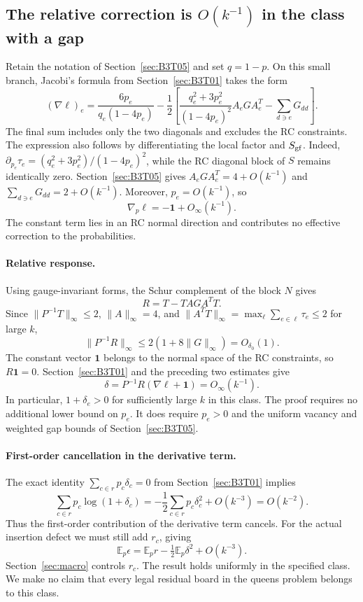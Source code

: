 \subsection{The relative correction is \texorpdfstring{$O(k^{-1})$}{O(1/k)} in the class with a
gap}\label{sec:B3T06}
Retain the notation of Section~\ref{sec:B3T05} and set $q=1-p$.
On this small branch, Jacobi's formula from Section~\ref{sec:B3T01} takes the form
\[
 (\nabla\ell)_e=\frac{6p_e}{q_e(1-4p_e)}
 -\frac12\left[
 \frac{q_e^2+3p_e^2}{(1-4p_e)^2}A_eGA_e^T
 -\sum_{d\ni e}G_{dd}\right].
\]
The final sum includes only the two diagonals and excludes the RC constraints.
The expression also follows by differentiating the local factor and $S_{\rm gf}$. Indeed,
$\partial_{p_e}\tau_e=(q_e^2+3p_e^2)/(1-4p_e)^2$, while the RC diagonal block of $S$ remains identically
zero.
Section~\ref{sec:B3T05} gives $A_eGA_e^T=4+O(k^{-1})$ and $\sum_{d\ni e}G_{dd}=2+O(k^{-1})$.
Moreover, $p_e=O(k^{-1})$, so
\[
 \boxed{\nabla_p\ell=-\mathbf1+O_\infty(k^{-1}).}
\]
The constant term lies in an RC normal direction and contributes no effective correction to the
probabilities.

\paragraph{Relative response.}
Using gauge-invariant forms, the Schur complement of the block $N$ gives
\[
 R=T-TAG A^TT.
\]
Since $\|P^{-1}T\|_\infty\le2$, $\|A\|_\infty=4$, and $\|A^TT\|_\infty=\max_\ell\sum_{e\in\ell}\tau_e\le2$
for large $k$,
\[
 \|P^{-1}R\|_\infty
 \le2(1+8\|G\|_\infty)=O_{\delta_0}(1).
\]
The constant vector $\mathbf1$ belongs to the normal space of the RC constraints, so $R\mathbf1=0$.
Section~\ref{sec:B3T01} and the preceding two estimates give
\[
 \boxed{\delta=P^{-1}R(\nabla\ell+\mathbf1)=O_\infty(k^{-1}).}
\]
In particular, $1+\delta_e>0$ for sufficiently large $k$ in this class. The proof requires no additional
lower bound on $p_e$. It does require $p_e>0$ and the uniform vacancy and weighted gap bounds of
Section~\ref{sec:B3T05}.

\paragraph{First-order cancellation in the derivative term.}
The exact identity $\sum_{c\in r}p_c\delta_c=0$ from Section~\ref{sec:B3T01} implies
\[
 \sum_{c\in r}p_c\log(1+\delta_c)
 =-\frac12\sum_{c\in r}p_c\delta_c^2+O(k^{-3})=O(k^{-2}).
\]
Thus the first-order contribution of the derivative term cancels. For the actual insertion defect we must
still add $r_c$, giving
\[
 \mathbb E_p\epsilon
 =\mathbb E_p r-\tfrac12\mathbb E_p\delta^2+O(k^{-3}).
\]
Section~\ref{sec:macro} controls $r_c$. The result holds uniformly in the specified class. We make no claim
that every legal residual board in the queens problem belongs to this class.
